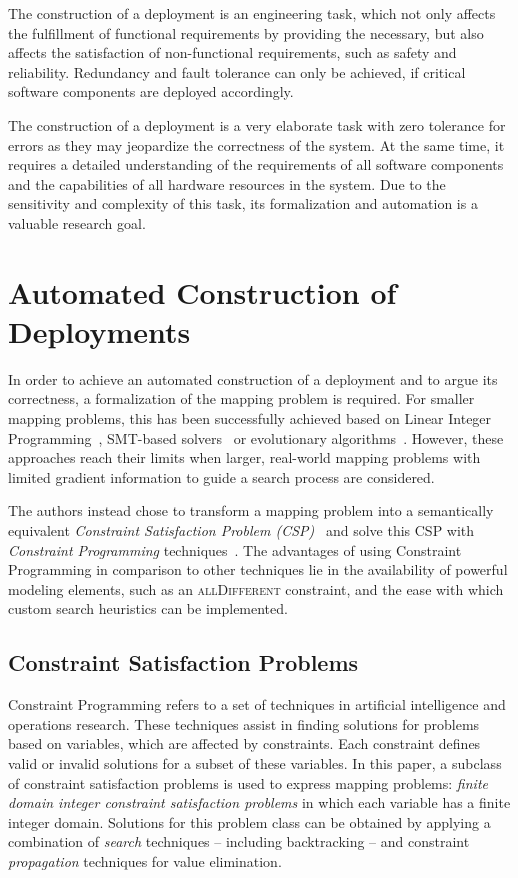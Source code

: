 \documentclass[english,biblatex]{lni}
\begin{document}
The construction of a deployment is an engineering task, which not only affects the fulfillment of functional requirements by providing the necessary, but also affects the satisfaction of non-functional requirements, such as safety and reliability.
Redundancy and fault tolerance can only be achieved, if critical software components are deployed accordingly.

The construction of a deployment is a very elaborate task with zero tolerance for errors as they may jeopardize the correctness of the system.
At the same time, it requires a detailed understanding of the requirements of all software components and the capabilities of all hardware resources in the system.
Due to the sensitivity and complexity of this task, its formalization and automation is a valuable research goal.

\section{Automated Construction of Deployments}

In order to achieve an automated construction of a deployment and to argue its correctness, a formalization of the mapping problem is required.
For smaller mapping problems, this has been successfully achieved based on Linear Integer Programming~\cite{Damm2006, Kugele2009}, SMT-based solvers~\cite{Voss2013} or evolutionary algorithms~\cite{White2011}.
However, these approaches reach their limits when larger, real-world mapping problems with limited gradient information to guide a search process are considered.

The authors instead chose to transform a mapping problem into a semantically equivalent \emph{Constraint Satisfaction Problem (CSP)}~\cite{Apt2003,Dechter2003} and solve this CSP with \emph{Constraint Programming} techniques~\cite{Rossi2006,Prudhomme2016}.
The advantages of using Constraint Programming in comparison to other techniques lie in the availability of powerful modeling elements, such as an \textsc{allDifferent} constraint, and the ease with which custom search heuristics can be implemented.

\subsection{Constraint Satisfaction Problems}
Constraint Programming refers to a set of techniques in artificial intelligence and operations research.
These techniques assist in finding solutions for problems based on variables, which are affected by constraints.
Each constraint defines valid or invalid solutions for a subset of these variables.
In this paper, a subclass of constraint satisfaction problems is used to express mapping problems:  \emph{finite domain integer constraint satisfaction problems} in which each variable has a finite integer domain.
Solutions for this problem class can be obtained by applying a combination of \emph{search} techniques -- including backtracking -- and constraint \emph{propagation} techniques for value elimination.
\end{document}

